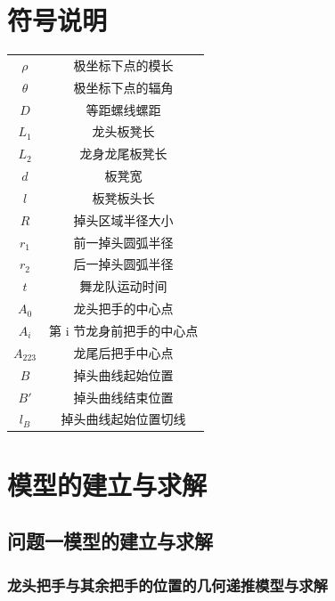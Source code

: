 \documentclass[a4paper]{article}
\begin{document}
	\section{符号说明}
	\begin{table}[H] %
		\captionsetup{skip=4pt} %
		\centering
		\setlength{\arrayrulewidth}{2pt} %
		\begin{tabular}{cc} %
			\hline
			\makebox[0.15\textwidth][c]{符号} & \makebox[0.6\textwidth][c]{说明}  \\
			\hline
			$\rho$ & 极坐标下点的模长  \\
			$\theta$ & 极坐标下点的辐角  \\
			$D$ & 等距螺线螺距  \\
			$L_1$ & 龙头板凳长  \\
			$L_2$ & 龙身龙尾板凳长  \\
			$d$ & 板凳宽  \\
			$l$ & 板凳板头长 \\
			$R$ & 掉头区域半径大小\\
			$r_1$ & 前一掉头圆弧半径\\
			$r_2$ & 后一掉头圆弧半径\\
			$t$ & 舞龙队运动时间  \\
			$A_0$ & 龙头把手的中心点  \\
			$A_i$ & 第 i 节龙身前把手的中心点  \\
			$A_{223}$ & 龙尾后把手中心点  \\
			$B$ & 掉头曲线起始位置 \\
			$B'$ & 掉头曲线结束位置 \\
			$l_B$ & 掉头曲线起始位置切线 \\
			\hline
		\end{tabular}
	\end{table}


	\section{模型的建立与求解}
	\subsection{问题一模型的建立与求解}
	\subsubsection{龙头把手与其余把手的位置的几何递推模型与求解}
\end{document}
